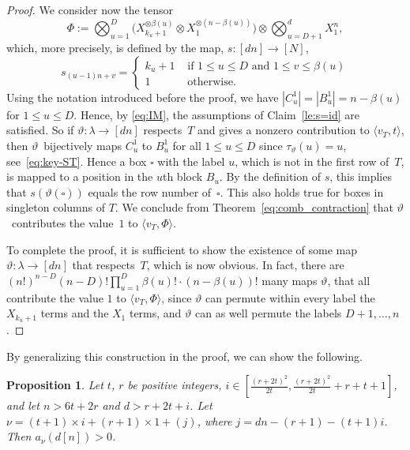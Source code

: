 \documentclass[11pt]{amsart}
\def\la{\lambda}
\newcommand{\out}{d}
\newcommand{\inn}{n}
\numberwithin{equation}{section}
\newtheorem{proposition}[theorem]{Proposition}
\begin{document}
\begin{proof}
We consider now the tensor 
$$
 \Phi := \bigotimes_{u=1}^{D} \big(X_{k_u +1}^{\otimes \beta(u)} \otimes X_1^{\otimes (n-\beta(u))} \big)
     \otimes \bigotimes_{u=D+1}^{d} X_1^{n} ,
$$
which, more precisely, is defined by the map,  
$s\colon [dn] \to [N]$,  
$$
 s_{(u-1)n + v} = \left\{\begin{array}{cl} 
   k_u+1 & \mbox{ if $1 \le u \le D$ and $1 \le v \le \beta(u)$} \\
          1  & \mbox{ otherwise.}
   \end{array}\right.                            
$$
Using the notation introduced before the proof, we have 
$|C^1_u| = |B^1_u| = n - \beta(u)$ for $1\le u \le D$. 
Hence, by \eqref{eq:IM}, the assumptions of Claim~\ref{le:s=id} 
are satisfied. 
So if $\vartheta\colon\la\to [dn]$ respects~$T$ 
and gives a nonzero contribution to $\langle v_T,t\rangle$, then 
$\vartheta$~bijectively maps $C^1_u$ to $B^1_u$ 
for all $1 \le u \le D$ since $\tau_\vartheta(u)=u$, 
see~\eqref{eq:key-ST}.   
Hence a box $\square$ with the label $u$, which is not in the first row of~$T$, 
is mapped to a position in the $u$th block $B_u$. 
By the definition of $s$, this implies that 
$s(\vartheta(\square))$ equals 
the row number of~$\square$.  
This also holds true for boxes in singleton columns of $T$.
We conclude from Theorem~\ref{eq:comb_contraction}
that $\vartheta$~contributes the value~$1$ to $\langle v_T,\Phi\rangle$.

To complete the proof, it is sufficient to show the 
existence of some map $\vartheta\colon\la \to [dn]$ that 
respects~$T$, which is now obvious.  
In fact, there are 
$(n!)^{n-D} (n-D)! \prod_{u=1}^{D} \beta(u)! \cdot (\inn -\beta(u))!$
many maps $\vartheta$, that all contribute the value $1$ to $\langle v_T,\Phi\rangle$,
since $\vartheta$ can permute within every label the $X_{k_u+1}$ terms and the $X_1$ terms,
and $\vartheta$ can as well permute the labels $D+1,\ldots,n$.
\end{proof}

By generalizing this construction in the proof, 
we can show the following. 

\begin{proposition}\label{prop:long_column}
Let $t$, $r$ be positive integers, $i \in [ \frac{ (r+2t)^2 }{2t}, \frac{ (r+2t)^2 }{2t} + r+t+1 ]$, 
and let  $\inn > 6t+2r$ and $\out> r+2t +i $. Let 
$\nu = (t+1) \times i + (r+1) \times 1 + (j)$,
where $j=\out\inn - (r+1) - (t+1)i $. Then $a_{\nu}(\out[\inn]) >0$. 
\end{proposition}
\end{document}
